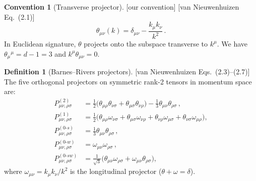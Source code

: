 \documentclass[12pt,a4paper]{article}
\theoremstyle{definition}
\newtheorem{definition}[proposition]{Definition}
\newtheorem{convention}[proposition]{Convention}
\theoremstyle{remark}
\newcommand{\fromlit}[1]{\textcolor{blue!70!black}{\textsf{[#1]}}}
\newcommand{\oursign}{\textcolor{teal!80!black}{\textsf{[our convention]}}}
\begin{document}
\begin{convention}[Transverse projector]
\label{conv:theta}
\oursign\;
\fromlit{van Nieuwenhuizen Eq.~(2.1)}
\begin{equation}
  \theta_{\mu\nu}(k) = \delta_{\mu\nu}
  - \frac{k_\mu k_\nu}{k^2}\,.
  \label{eq:theta}
\end{equation}
In Euclidean signature, $\theta$ projects onto the subspace
transverse to $k^\mu$.  We have $\theta_\mu{}^\mu = d-1 = 3$ and
$k^\mu\theta_{\mu\nu} = 0$.
\end{convention}

\begin{definition}[Barnes--Rivers projectors]
\label{def:barnes-rivers}
\fromlit{van Nieuwenhuizen Eqs.~(2.3)--(2.7)}
The five orthogonal projectors on symmetric rank-2 tensors
in momentum space are:
\begin{align}
  P^{(2)}_{\mu\nu,\rho\sigma}
  &= \frac{1}{2}\bigl(
    \theta_{\mu\rho}\theta_{\nu\sigma}
    + \theta_{\mu\sigma}\theta_{\nu\rho}
  \bigr) - \frac{1}{3}\theta_{\mu\nu}\theta_{\rho\sigma}\,,
    \label{eq:P2}\\[4pt]
  P^{(1)}_{\mu\nu,\rho\sigma}
  &= \frac{1}{2}\bigl(
    \theta_{\mu\rho}\omega_{\nu\sigma}
    + \theta_{\mu\sigma}\omega_{\nu\rho}
    + \theta_{\nu\rho}\omega_{\mu\sigma}
    + \theta_{\nu\sigma}\omega_{\mu\rho}
  \bigr),
    \label{eq:P1}\\[4pt]
  P^{(0\text{-}s)}_{\mu\nu,\rho\sigma}
  &= \frac{1}{3}\theta_{\mu\nu}\theta_{\rho\sigma}\,,
    \label{eq:P0s}\\[4pt]
  P^{(0\text{-}w)}_{\mu\nu,\rho\sigma}
  &= \omega_{\mu\nu}\omega_{\rho\sigma}\,,
    \label{eq:P0w}\\[4pt]
  P^{(0\text{-}sw)}_{\mu\nu,\rho\sigma}
  &= \frac{1}{\sqrt{3}}\bigl(
    \theta_{\mu\nu}\omega_{\rho\sigma}
    + \omega_{\mu\nu}\theta_{\rho\sigma}
  \bigr),
    \label{eq:P0sw}
\end{align}
where $\omega_{\mu\nu} = k_\mu k_\nu/k^2$ is the longitudinal
projector ($\theta + \omega = \delta$).
\end{definition}
\end{document}
